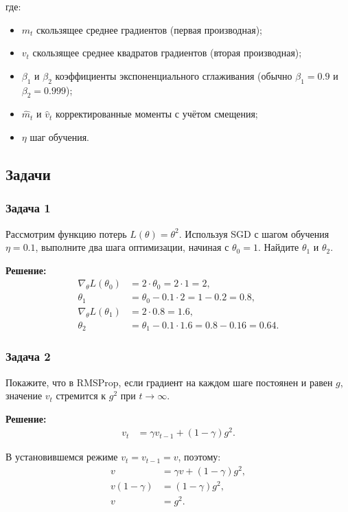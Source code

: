 где:
\begin{itemize}
    \item $m_t$ \textendash{} скользящее среднее градиентов (первая производная);
    \item $v_t$ \textendash{} скользящее среднее квадратов градиентов (вторая производная);
    \item $\beta_1$ и $\beta_2$ \textendash{} коэффициенты экспоненциального сглаживания (обычно $\beta_1 = 0.9$ и $\beta_2 = 0.999$);
    \item $\hat{m}_t$ и $\hat{v}_t$ \textendash{} корректированные моменты с учётом смещения;
    \item $\eta$ \textendash{} шаг обучения.
\end{itemize}

\subsection{Задачи}

\subsubsection*{Задача 1}
Рассмотрим функцию потерь $L(\theta) = \theta^2$. Используя SGD с шагом обучения $\eta = 0.1$, выполните два шага оптимизации, начиная с $\theta_0 = 1$. Найдите $\theta_1$ и $\theta_2$.

\textbf{Решение:}
\begin{align*}
    \nabla_\theta L(\theta_0) &= 2 \cdot \theta_0 = 2 \cdot 1 = 2, \\
    \theta_1 &= \theta_0 - 0.1 \cdot 2 = 1 - 0.2 = 0.8, \\
    \nabla_\theta L(\theta_1) &= 2 \cdot 0.8 = 1.6, \\
    \theta_2 &= \theta_1 - 0.1 \cdot 1.6 = 0.8 - 0.16 = 0.64.
\end{align*}

\subsubsection*{Задача 2}
Покажите, что в RMSProp, если градиент на каждом шаге постоянен и равен $g$, значение $v_t$ стремится к $g^2$ при $t \to \infty$.

\textbf{Решение:}
\begin{align*}
    v_t &= \gamma v_{t-1} + (1 - \gamma) g^2.
\end{align*}

В установившемся режиме $v_t = v_{t-1} = v$, поэтому:
\begin{align*}
    v &= \gamma v + (1 - \gamma) g^2, \\
    v (1 - \gamma) &= (1 - \gamma) g^2, \\
    v &= g^2.
\end{align*}

